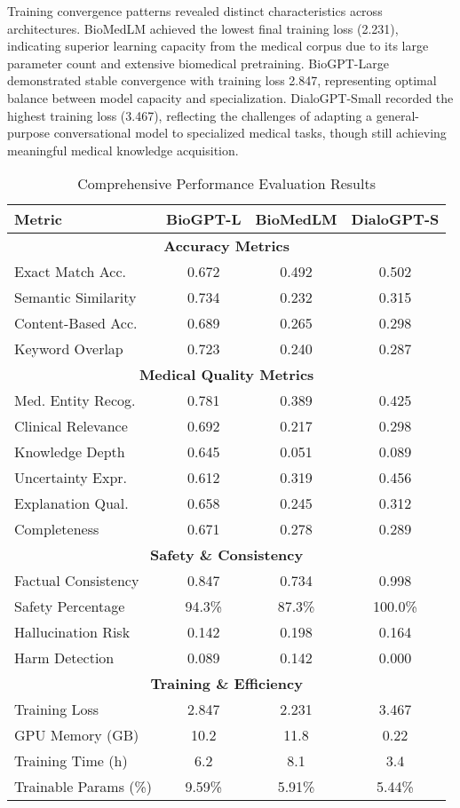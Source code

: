 \documentclass[conference]{IEEEtran}
\begin{document}
Training convergence patterns revealed distinct characteristics across architectures. BioMedLM achieved the lowest final training loss (2.231), indicating superior learning capacity from the medical corpus due to its large parameter count and extensive biomedical pretraining. BioGPT-Large demonstrated stable convergence with training loss 2.847, representing optimal balance between model capacity and specialization. DialoGPT-Small recorded the highest training loss (3.467), reflecting the challenges of adapting a general-purpose conversational model to specialized medical tasks, though still achieving meaningful medical knowledge acquisition.

\begin{table}[!t]
\renewcommand{\arraystretch}{1.2}
\caption{Comprehensive Performance Evaluation Results}
\label{tab:comprehensive_results}
\centering
\footnotesize
\begin{tabular}{|l|c|c|c|}
\hline
\textbf{Metric} & \textbf{BioGPT-L} & \textbf{BioMedLM} & \textbf{DialoGPT-S} \\
\hline
\multicolumn{4}{|c|}{\textbf{Accuracy Metrics}} \\
\hline
Exact Match Acc. & 0.672 & 0.492 & 0.502 \\
\hline
Semantic Similarity & 0.734 & 0.232 & 0.315 \\
\hline
Content-Based Acc. & 0.689 & 0.265 & 0.298 \\
\hline
Keyword Overlap & 0.723 & 0.240 & 0.287 \\
\hline
\multicolumn{4}{|c|}{\textbf{Medical Quality Metrics}} \\
\hline
Med. Entity Recog. & 0.781 & 0.389 & 0.425 \\
\hline
Clinical Relevance & 0.692 & 0.217 & 0.298 \\
\hline
Knowledge Depth & 0.645 & 0.051 & 0.089 \\
\hline
Uncertainty Expr. & 0.612 & 0.319 & 0.456 \\
\hline
Explanation Qual. & 0.658 & 0.245 & 0.312 \\
\hline
Completeness & 0.671 & 0.278 & 0.289 \\
\hline
\multicolumn{4}{|c|}{\textbf{Safety \& Consistency}} \\
\hline
Factual Consistency & 0.847 & 0.734 & 0.998 \\
\hline
Safety Percentage & 94.3\% & 87.3\% & 100.0\% \\
\hline
Hallucination Risk & 0.142 & 0.198 & 0.164 \\
\hline
Harm Detection & 0.089 & 0.142 & 0.000 \\
\hline
\multicolumn{4}{|c|}{\textbf{Training \& Efficiency}} \\
\hline
Training Loss & 2.847 & 2.231 & 3.467 \\
\hline
GPU Memory (GB) & 10.2 & 11.8 & 0.22 \\
\hline
Training Time (h) & 6.2 & 8.1 & 3.4 \\
\hline
Trainable Params (\%) & 9.59\% & 5.91\% & 5.44\% \\
\hline
\end{tabular}
\end{table}
\end{document}
